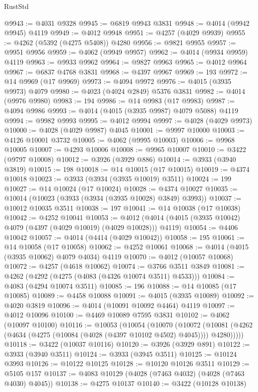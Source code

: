 \begin{lexlean}{RustStd}
\begin{coremodule}
@9943 := @4031 @9328
@9945 := @6819 @9943 @3831
@9948 := @4014 (@9942 @9945) @4119
@9949 := @4012 @9948
@9951 := @4257 (@4029 @9939)
@9955 := @4262 (@5392 (@4275 @5408)) @4280
@9956 := @9821 @9955
@9957 := @9951 @9956
@9959 := @4062 (@9949 @9957)
@9962 := @4014 (@9934 @9959) @4119
@9963 := @9933 @9962
@9964 := @9827 @9963
@9965 := @4012 @9964
@9967 := @6837 @4768 @3831
@9968 := @4397 @9967
@9969 := 193
@9972 := @14 @9969 (@17 @9969)
@9973 := @4094 @9972
@9976 := @4015 (@3935 @9973) @4079
@9980 := @4023 (@4024 @2849) @5376 @3831
@9982 := @4014 (@9976 @9980)
@9983 := 194
@9986 := @14 @9983 (@17 @9983)
@9987 := @4094 @9986
@9993 := @4014 (@4015 (@3935 @9987) @4079 @5088) @4119
@9994 := @9982 @9993
@9995 := @4012 @9994
@9997 := @4028 (@4029 @9973)
@10000 := @4028 (@4029 @9987) @4045
@10001 := @9997 @10000
@10003 := @4126 @10001 @3732
@10005 := @4062 (@9995 @10003)
@10006 := @9968 @10005
@10007 := @4293 @10006
@10008 := @9965 @10007
@10010 := @3422 (@9797 @10008)
@10012 := @3926 (@3929 @886)
@10014 := @3933 (@3940 @3819)
@10015 := 198
@10018 := @14 @10015 (@17 @10015)
@10019 := @4374 @10018
@10023 := @3933 (@3934 (@3935 @10019) @3511)
@10024 := 199
@10027 := @14 @10024 (@17 @10024)
@10028 := @4374 @10027
@10035 := @10014 (@10023 (@3933 (@3934 (@3935 @10028) @3849) @3993))
@10037 := @10012 @10035 @3511
@10038 := 197
@10041 := @14 @10038 (@17 @10038)
@10042 := @4252 @10041
@10053 := @4012 (@4014 (@4015 (@3935 @10042) @4079 (@4397 (@4029 @10019) (@4029 @10028))) @4119)
@10054 := @4406 @10042
@10057 := @4014 (@4414 (@4029 @10042))
@10058 := 195
@10061 := @14 @10058 (@17 @10058)
@10062 := @4252 @10061
@10068 := @4014 (@4015 (@3935 @10062) @4079 @4034) @4119
@10070 := @4012 (@10057 @10068)
@10072 := @4257 (@4618 @10062)
@10074 := @3766 @3511 @3849
@10081 := @4262 (@4292 (@4275 (@4083 (@4326 @10074 @3511) @4533)))
@10084 := @4083 (@4294 @10074 @3511)
@10085 := 196
@10088 := @14 @10085 (@17 @10085)
@10089 := @4458 @10088
@10091 := @4015 (@3935 @10089)
@10092 := @4020 @3819
@10096 := @4014 (@10091 @10092 @4464) @4119
@10097 := @4012 @10096
@10100 := @4469 @10089 @7595 @3831
@10102 := @4062 (@10097 @10100)
@10116 := @10053
    (@10054
      (@10070
        (@10072
          (@10081 (@4262 (@4634 (@4275 (@10084 (@4028 (@4397 @10102 @4502) @4045)))) @4280)))))
@10118 := @3422 (@10037 @10116)
@10120 := @3926 (@3929 @891)
@10122 := @3933 (@3940 @3511)
@10124 := @3933 (@3945 @3511)
@10125 := @10124 @3993
@10126 := @10122 @10125
@10128 := @10120 @10126 @3511
@10129 := @5105 @157
@10137 := @4083 @10129 (@4028 (@7463 @4032) (@4028 (@7463 @4030) @4045))
@10138 := @4275 @10137
@10140 := @3422 (@10128 @10138)

\end{coremodule}
\end{lexlean}
